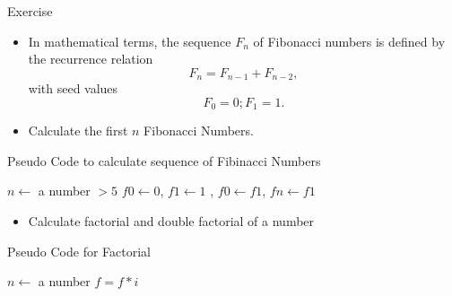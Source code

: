 \documentclass[10pt,t]{beamer}
\begin{document}
\begin{frame}[allowframebreaks]{Exercise}
  \begin{itemize}
  \item In mathematical terms, the sequence $F_n$ of Fibonacci numbers is defined by the recurrence relation
    \begin{equation*}
      F_n = F_{n-1} + F_{n-2},
    \end{equation*}
    with seed values
    \begin{equation*}
      F_0 = 0 ;  F_1 = 1.
    \end{equation*}
  \item Calculate the first $n$ Fibonacci Numbers.
  \end{itemize}
  \begin{algorithm}[H]
    \caption{Pseudo Code to calculate sequence of Fibinacci Numbers}
    \begin{algorithmic}
      \State $n \gets$ a number $> 5$
      \State $f0 \gets 0$, $f1 \gets 1$
      , {$f0 \gets f1$}, {$fn \gets f1$}
      \EndDo
    \end{algorithmic}
  \end{algorithm}

  \framebreak

  \begin{itemize}
  \item Calculate factorial and double factorial of a number
  \end{itemize}
  \begin{algorithm}[H]
    \caption{Pseudo Code for Factorial}
    \begin{algorithmic}
      \State $n \gets$ a number
      \State $f = f * i$
      \EndDo
    \end{algorithmic}
  \end{algorithm}

  \framebreak
  

\end{frame}
\end{document}
